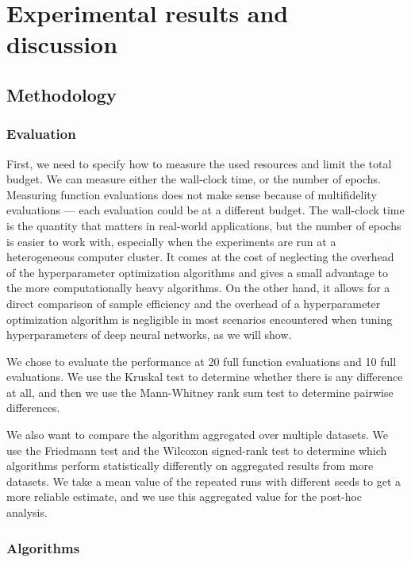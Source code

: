 \chapter{Experimental results and discussion}
\section{Methodology}

\subsection{Evaluation}

First, we need to specify how to measure the used resources and limit the total budget. We can measure either the wall-clock time, or the number of epochs. Measuring function evaluations does not make sense because of multifidelity evaluations --- each evaluation could be at a different budget. The wall-clock time is the quantity that matters in real-world applications, but the number of epochs is easier to work with, especially when the experiments are run at a heterogeneous computer cluster. It comes at the cost of neglecting the overhead of the hyperparameter optimization algorithms and gives a small advantage to the more computationally heavy algorithms. On the other hand, it allows for a direct comparison of sample efficiency and the overhead of a hyperparameter optimization algorithm is negligible in most scenarios encountered when tuning hyperparameters of deep neural networks, as we will show.

We chose to evaluate the performance at 20 full function evaluations and 10 full evaluations. We use the Kruskal test to determine whether there is any difference at all, and then we use the Mann-Whitney rank sum test to determine pairwise differences.

We also want to compare the algorithm aggregated over multiple datasets. We use the Friedmann test and the Wilcoxon signed-rank test to determine which algorithms perform statistically differently on aggregated results from more datasets. We take a mean value of the repeated runs with different seeds to get a more reliable estimate, and we use this aggregated value for the post-hoc analysis.

\subsection{Algorithms}

